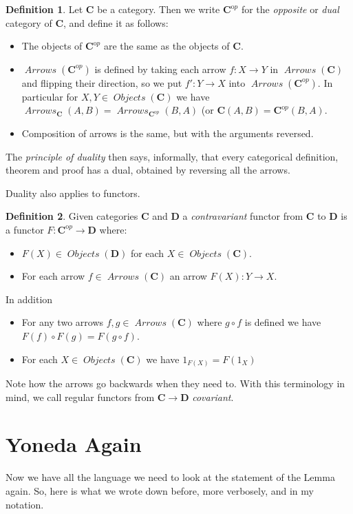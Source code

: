 \documentclass[12pt]{article}
\theoremstyle{definition}
\theoremstyle{definition}
\newtheorem{defn}{Definition}[]
\theoremstyle{definition}
\numberwithin{equation}{section}
\newcommand{\cat}[1]{\mathbf{#1}}      %
\newcommand{\CC}{\cat{C}}
\newcommand{\CCop}{\cat{C}^{\mathrm op}}
\newcommand{\DD}{\cat{D}}
\DeclareMathOperator{\Arrows}{\mathit{Arrows}}
\DeclareMathOperator{\Objects}{\mathit{Objects}}
\def\objc{\Objects(\cat{C})}
\def\ni{\goodbreak\noindent}
\begin{document}
\begin{defn}
Let $\CC$ be a category. Then we write $\CCop$ for the {\it opposite} or {\it dual}
category of $\CC$, and define it as follows:
\begin{itemize}
\item The objects of $\CCop$ are the same as the objects of $\CC$.
\item $\Arrows(\CCop)$ is defined by taking each arrow $f :X \to Y$ in $\Arrows(\CC)$ and
flipping their direction, so we put $f': Y \to X$ into $\Arrows(\CCop)$. In particular for
$X, Y \in \Objects(\CC)$ we have $\Arrows_{\CC}(A, B) = \Arrows_{\CCop}(B, A)$ (or $\CC(A,
B) = \CCop(B, A)$.
\item Composition of arrows is the same, but with the arguments reversed.
\end{itemize}
\end{defn}
\ni
The {\it principle of duality} then says, informally, that every categorical definition,
theorem and proof has a dual, obtained by reversing all the arrows.

Duality also applies to functors.

\begin{defn}
Given categories $\CC$ and $\DD$ a {\it contravariant} functor from $\CC$ to $\DD$ is a
functor $F: \CCop \to \DD$ where:
\begin{itemize}
\item $F(X) \in \Objects(\DD)$ for each $X \in \objc$.
\item For each arrow $f \in \Arrows(\CC)$ an arrow $F(X): Y \to X$.
\end{itemize}
\goodbreak
\ni
In addition
\begin{itemize}
\item For any two arrows $f, g \in \Arrows(\CC)$ where $g \circ f$ is defined we have
$F(f) \circ F(g) = F(g \circ f)$.
\item For each $X \in \Objects(\CC)$ we have $1_{F(X)} = F(1_X)$
\end{itemize}

\end{defn}
\ni
Note how the arrows go backwards when they need to. With this terminology in mind, we call
regular functors from $\CC \to \DD$ {\it covariant}.

\section{Yoneda Again}

Now we have all the language we need to look at the statement of the Lemma again.
So, here is what we wrote down before, more verbosely, and in my notation.
\end{document}

